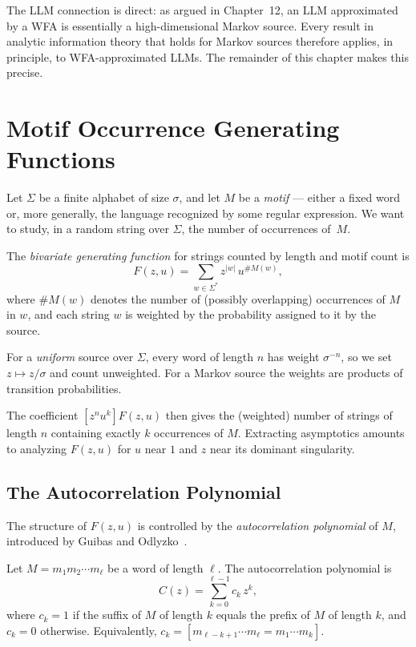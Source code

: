 The LLM connection is direct: as argued in Chapter~12, an LLM approximated by a WFA is essentially a high-dimensional Markov source. Every result in analytic information theory that holds for Markov sources therefore applies, in principle, to WFA-approximated LLMs. The remainder of this chapter makes this precise.

\section{Motif Occurrence Generating Functions}
\label{ch17:motif-gf}

Let $\Sigma$ be a finite alphabet of size $\sigma$, and let $M$ be a \emph{motif} --- either a fixed word or, more generally, the language recognized by some regular expression. We want to study, in a random string over $\Sigma$, the number of occurrences of~$M$.

\begin{definition}
\label{ch17:def-bivariate-gf}
The \emph{bivariate generating function} for strings counted by length and motif count is
\[
  F(z, u) = \sum_{w \in \Sigma^*} z^{|w|}\, u^{\#M(w)},
\]
where $\#M(w)$ denotes the number of (possibly overlapping) occurrences of $M$ in $w$, and each string $w$ is weighted by the probability assigned to it by the source.
\end{definition}

For a \emph{uniform} source over $\Sigma$, every word of length $n$ has weight $\sigma^{-n}$, so we set $z \mapsto z/\sigma$ and count unweighted. For a Markov source the weights are products of transition probabilities.

The coefficient $[z^n u^k] F(z,u)$ then gives the (weighted) number of strings of length $n$ containing exactly $k$ occurrences of $M$. Extracting asymptotics amounts to analyzing $F(z, u)$ for $u$ near $1$ and $z$ near its dominant singularity.

\subsection{The Autocorrelation Polynomial}

The structure of $F(z, u)$ is controlled by the \emph{autocorrelation polynomial} of $M$, introduced by Guibas and Odlyzko~\cite{GuibasOdlyzko1981}.

\begin{definition}
\label{ch17:def-autocorrelation}
Let $M = m_1 m_2 \cdots m_\ell$ be a word of length $\ell$. The autocorrelation polynomial is
\[
  C(z) = \sum_{k=0}^{\ell-1} c_k\, z^k,
\]
where $c_k = 1$ if the suffix of $M$ of length $k$ equals the prefix of $M$ of length $k$, and $c_k = 0$ otherwise. Equivalently, $c_k = [m_{\ell-k+1}\cdots m_\ell = m_1 \cdots m_k]$.
\end{definition}


